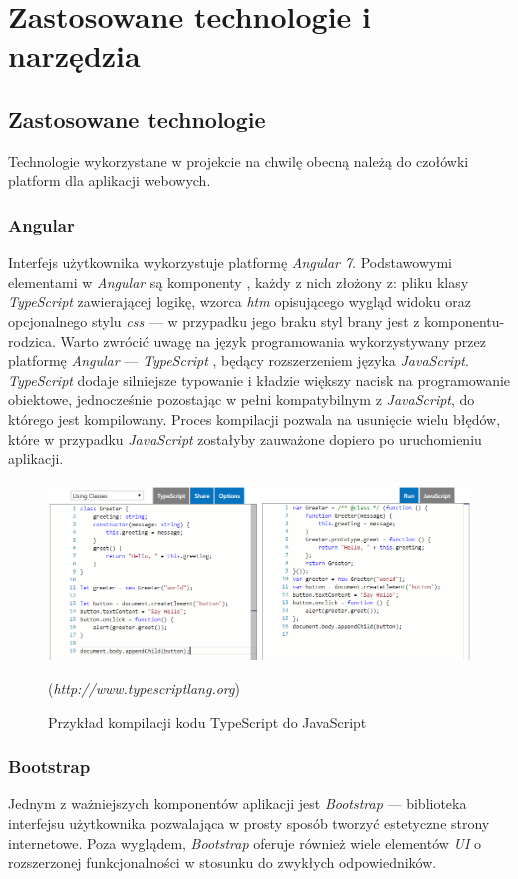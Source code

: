 \documentclass[eng,printmode,openany]{mgr}
\begin{document}
	\chapter{Zastosowane technologie i narzędzia}
	\section{Zastosowane technologie}
	Technologie wykorzystane w projekcie na chwilę obecną należą do czołówki platform dla aplikacji webowych.
	\subsection{Angular}
	Interfejs użytkownika wykorzystuje platformę \textit{Angular 7}. Podstawowymi elementami w \textit{Angular} są komponenty \cite{angular-components}, każdy z nich złożony z: pliku klasy \textit{TypeScript} zawierającej logikę, wzorca \textit{htm} opisującego wygląd widoku oraz opcjonalnego stylu \textit{css} — w przypadku jego braku styl brany jest z komponentu-rodzica. Warto zwrócić uwagę na język programowania wykorzystywany przez platformę \textit{Angular} — \textit{TypeScript} \cite{msdn-ts}, będący rozszerzeniem języka \textit{JavaScript}. \textit{TypeScript} dodaje silniejsze typowanie i kładzie większy nacisk na programowanie obiektowe, jednocześnie pozostając w pełni kompatybilnym z \textit{JavaScript}, do którego jest kompilowany. Proces kompilacji pozwala na usunięcie wielu błędów, które w przypadku \textit{JavaScript} zostałyby zauważone dopiero po uruchomieniu aplikacji.
	\begin{figure}[H]
		\centering
		\includegraphics[width=\textwidth]{images/ts-to-js.png}
		\caption{Przykład kompilacji kodu TypeScript do JavaScript}
		\small
		(\textit{http://www.typescriptlang.org})
	\end{figure}
	\subsection{Bootstrap}
	Jednym z ważniejszych komponentów aplikacji jest \textit{Bootstrap} — biblioteka interfejsu użytkownika pozwalająca w prosty sposób tworzyć estetyczne strony internetowe. Poza wyglądem, \textit{Bootstrap} oferuje również wiele elementów \textit{UI} o rozszerzonej funkcjonalności w stosunku do zwykłych odpowiedników.
	
\end{document}
